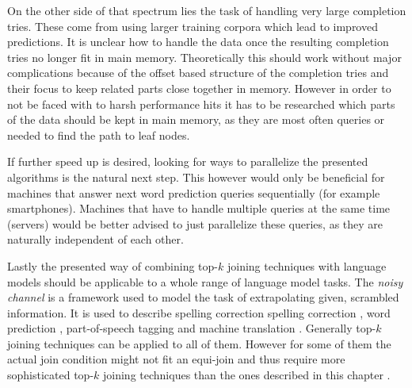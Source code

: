 On the other side of that spectrum lies the task of handling very large
completion tries.
These come from using larger training corpora which lead to improved
predictions.
It is unclear how to handle the data once the resulting completion tries no
longer fit in main memory.
Theoretically this should work without major complications because of the offset
based structure of the completion tries and their focus to keep related parts
close together in memory.
However in order to not be faced with to harsh performance hits it has to be
researched which parts of the data should be kept in main memory, as they
are most often queries or needed to find the path to leaf nodes.

If further speed up is desired, looking for ways to parallelize the presented
algorithms is the natural next step.
This however would only be beneficial for machines that answer next word
prediction queries sequentially (for example smartphones).
Machines that have to handle multiple queries at the same time (servers) would
be better advised to just parallelize these queries, as they are naturally
independent of each other.

Lastly the presented way of combining top-$k$ joining techniques with language
models should be applicable to a whole range of language model tasks.
The \emph{noisy channel} \parencite{Shannon1948} is a framework used to model
the task of extrapolating given, scrambled information.
It is used to describe spelling correction spelling correction
\parencite{JurafskyMartin2009,Manning2008,Kernighan1990,Mays1991},
word prediction \parencite{Bickel2005}, part-of-speech tagging
\parencite{Church1988} and machine translation \parencite{Brown1990}.
Generally top-$k$ joining techniques can be applied to all of them.
However for some of them the actual join condition might not fit an equi-join
and thus require more sophisticated top-$k$ joining techniques than the ones
described in this chapter \parencite{Ilyas2004}.

